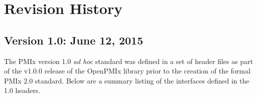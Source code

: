 \chapter{Revision History}
\label{chap:revisions}

\section{Version 1.0: June 12, 2015}

\par
The \ac{PMIx} version 1.0 \textit{ad hoc} standard was defined in a set of header files as part of the v1.0.0 release of the OpenPMIx library prior to the creation of the formal \ac{PMIx} 2.0 standard.
Below are a summary listing of the interfaces defined in the 1.0 headers.

